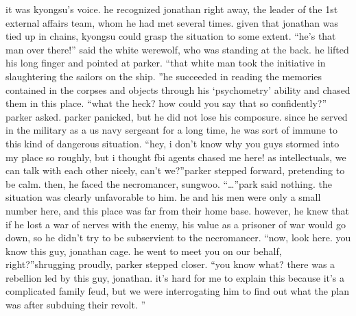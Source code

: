 it was kyongsu’s voice.
 he recognized jonathan right away, the leader of the 1st external affairs team, whom he had met several times.
 given that jonathan was tied up in chains, kyongsu could grasp the situation to some extent.
“he’s that man over there!” said the white werewolf, who was standing at the back.
he lifted his long finger and pointed at parker.
“that white man took the initiative in slaughtering the sailors on the ship.
”he succeeded in reading the memories contained in the corpses and objects through his ‘psychometry’ ability and chased them in this place.
“what the heck? how could you say that so confidently?” parker asked.
parker panicked, but he did not lose his composure.
 since he served in the military as a us navy sergeant for a long time, he was sort of immune to this kind of dangerous situation.
“hey, i don’t know why you guys stormed into my place so roughly, but i thought fbi agents chased me here! as intellectuals, we can talk with each other nicely, can’t we?”parker stepped forward, pretending to be calm.
 then, he faced the necromancer, sungwoo.
“…”park said nothing.
 the situation was clearly unfavorable to him.
 he and his men were only a small number here, and this place was far from their home base.
however, he knew that if he lost a war of nerves with the enemy, his value as a prisoner of war would go down, so he didn’t try to be subservient to the necromancer.
“now, look here.
 you know this guy, jonathan cage.
 he went to meet you on our behalf, right?”shrugging proudly, parker stepped closer.
“you know what? there was a rebellion led by this guy, jonathan.
 it’s hard for me to explain this because it’s a complicated family feud, but we were interrogating him to find out what the plan was after subduing their revolt.
”

 
